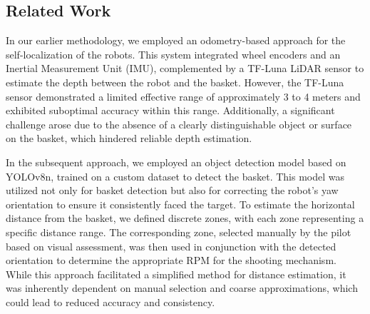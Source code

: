 \documentclass[a4paper]{article}
\begin{document}
\begin{multicols}{2}
\section{Related Work}
\par \noindent
In our earlier methodology, we employed an odometry-based approach for the self-localization of the robots. This system integrated wheel encoders and an Inertial Measurement Unit (IMU), complemented by a TF-Luna LiDAR sensor to estimate the depth between the robot and the basket. However, the TF-Luna sensor demonstrated a limited effective range of approximately 3 to 4 meters and exhibited suboptimal accuracy within this range. Additionally, a significant challenge arose due to the absence of a clearly distinguishable object or surface on the basket, which hindered reliable depth estimation.
\par \noindent
In the subsequent approach, we employed an object detection model based on YOLOv8n, trained on a custom dataset to detect the basket. This model was utilized not only for basket detection but also for correcting the robot’s yaw orientation to ensure it consistently faced the target. To estimate the horizontal distance from the basket, we defined discrete zones, with each zone representing a specific distance range. The corresponding zone, selected manually by the pilot based on visual assessment, was then used in conjunction with the detected orientation to determine the appropriate RPM for the shooting mechanism. While this approach facilitated a simplified method for distance estimation, it was inherently dependent on manual selection and coarse approximations, which could lead to reduced accuracy and consistency.


\end{multicols}
\end{document}
